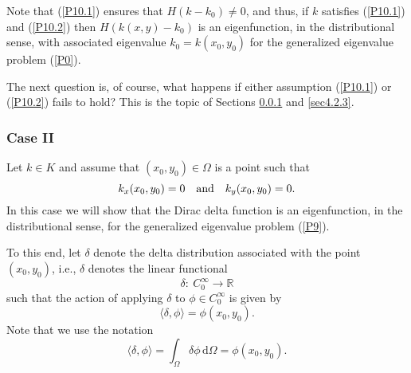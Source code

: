 \documentclass{imanum}
\begin{document}
Note that (\ref{P10.1}) ensures that $H(k-k_0) \neq 0$, and thus,
if $k$ satisfies (\ref{P10.1}) and (\ref{P10.2}) then
$H(k(x,y)-k_0)$ is an eigenfunction, in the distributional sense, with
associated eigenvalue $k_0=k(x_0,y_0)$ for the generalized eigenvalue
problem (\ref{P0}).

The next question is, of course, what happens if either assumption
(\ref{P10.1}) or (\ref{P10.2}) fails to hold? This is the topic of
Sections \ref{sec4.2.2} and \ref{sec4.2.3}.


\subsubsection{Case II}
\label{sec4.2.2}

Let $k \in K$ and assume that $(x_0,y_0) \in \Omega$ is a point such that
\begin{equation}
k_x(x_0,y_0) = 0 \quad \hbox{and} \quad k_y(x_0,y_0) = 0.
\label{Pc1}
\end{equation}
In this case we will show that the Dirac delta function is an
eigenfunction, in the distributional sense, for the generalized
eigenvalue problem (\ref{P9}).

To this end, let $\delta$ denote the delta distribution associated
with the point $(x_0,y_0)$, i.e., $\delta$ denotes the linear functional
\begin{equation*}
\delta:\ C^{\infty}_0 \rightarrow \mathbb{R}
\end{equation*}
such that the action of applying $\delta$ to $\phi \in C^\infty_0$ is
given by
\begin{equation}
\langle \delta,\phi \rangle = \phi(x_0,y_0).
\label{Pc1.1}
\end{equation}
Note that we use the notation
\begin{equation*}
\langle \delta,\phi \rangle = \int_\Omega \delta \phi\,
\mathrm{d} \Omega = \phi(x_0,y_0).
\end{equation*}
\end{document}
